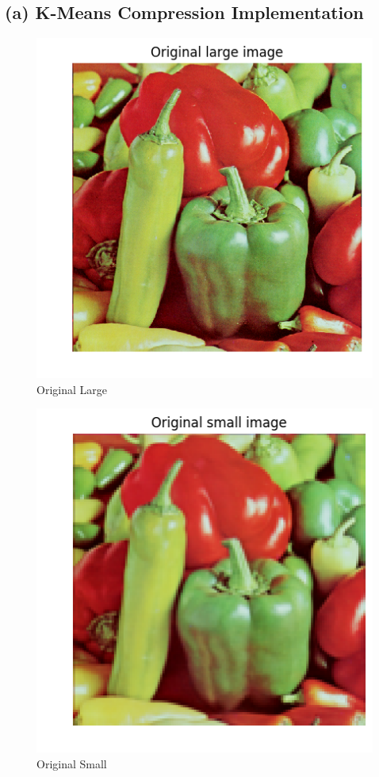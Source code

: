 \documentclass[11pt]{article}
\begin{document}
	\subsection{(a) K-Means Compression Implementation}
	\begin{figure}[H]
		\centering
		\includegraphics[width=\linewidth]{src/k_means/orig_large.png}
		\caption{Original Large}
	\end{figure}
	
	\begin{figure}[H]
		\centering
		\includegraphics[width=\linewidth]{src/k_means/orig_small.png}
		\caption{Original Small}
	\end{figure}
	
\end{document}
